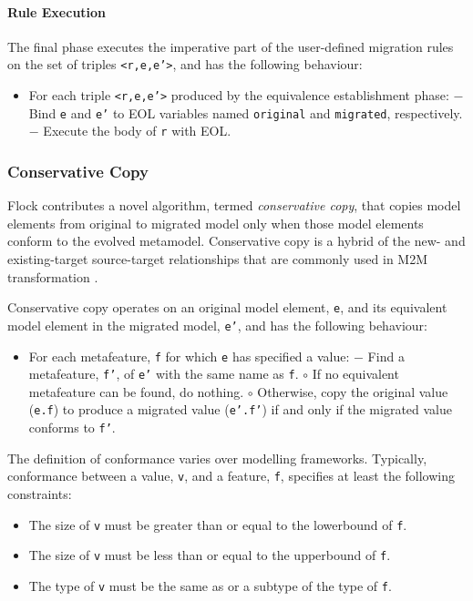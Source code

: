 \paragraph{Rule Execution}
The final phase executes the imperative part of the user-defined migration rules on the set of triples \texttt{<r,e,e'>}, and has the following behaviour:

\begin{itemize}
	\item For each triple \texttt{<r,e,e'>} produced by the equivalence establishment phase:
	\subitem $-$ Bind \texttt{e} and \texttt{e'} to EOL variables named \texttt{original} and \texttt{migrated}, respectively.
	\subitem $-$ Execute the body of \texttt{r} with EOL.
\end{itemize}


\subsubsection{Conservative Copy}
\label{subsubsec:conservative_copying}
Flock contributes a novel algorithm, termed \emph{conservative copy}, that copies model elements from original to migrated model only when those model elements conform to the evolved metamodel. Conservative copy is a hybrid of the new- and existing-target source-target relationships that are commonly used in M2M transformation \cite{czarnecki06survey}.

Conservative copy operates on an original model element, \texttt{e}, and its equivalent model element in the migrated model, \texttt{e'}, and has the following behaviour:

\begin{itemize}
	\item For each metafeature, \texttt{f} for which \texttt{e} has specified a value:
		\subitem $-$ Find a metafeature, \texttt{f'}, of \texttt{e'} with the same name as \texttt{f}.
			\subsubitem $\circ$ If no equivalent metafeature can be found, do nothing.
			\subsubitem $\circ$ Otherwise, copy the original value (\texttt{e.f}) to produce a migrated value (\texttt{e'.f'}) if and only if the migrated value conforms to \texttt{f'}.
\end{itemize}

The definition of conformance varies over modelling frameworks. Typically, conformance between a value, \texttt{v}, and a feature, \texttt{f}, specifies at least the following constraints:

\begin{itemize}
	\item The size of \texttt{v} must be greater than or equal to the lowerbound of \texttt{f}.
	\item The size of \texttt{v} must be less than or equal to the upperbound of \texttt{f}.
	\item The type of \texttt{v} must be the same as or a subtype of the type of \texttt{f}.
\end{itemize}


